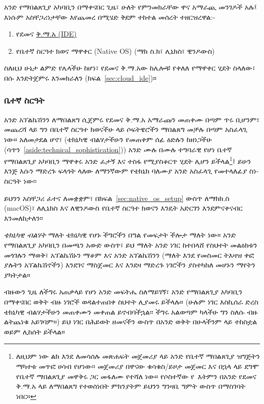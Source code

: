 አንድ የማበልጸጊያ አካባቢን በማቀናበር ጊዜ፣ ሁለት የምንመክራቸው ዋና አማራጪ መንገዶች አሉ፤ እነሱም አስቸጋሪነታቸው እየጨመረ በሚሄድ ቅደም ተከተል መሰረት ተዘርዝረዋል:-

\begin{enumerate}
  \item የደመና \href{https://en.wikipedia.org/wiki/Integrated_development_environment}{ቅ.ማ.አ (IDE)}
  \item የቤተኛ ስርዓተ ክወና ማዋቀር (Native OS) (ማክ ስ.ክ፣ ሊኒክስ፣ ዊንዶውስ)
\end{enumerate}

ስለዚህ ሁኔታ ልምድ የሌላችሁ ከሆነ፣ የደመና ቅ.ማ.አው ከሌሎቹ የቀለለ የማዋቀር ሂደት ስላለው፣ በሱ እንድትጀምሩ እንመክራለን (ክፍል~\ref{sec:cloud_ide})።

\subsubsection{ቤተኛ ስርዓት} %
\label{sec:native_system}

አንድ አፕልኬሽንን ለማበልጸግ ሲጀምሩ የደመና ቅ.ማ.አ አማራጩን መጠቀሙ በጣም ጥሩ ቢሆንም፣
መጨረሻ ላይ ግን በቤተኛ ስርዓተ ክወናችሁ ላይ ሶፍትዌሮችን ማበልጸግ መቻሉ በጣም አስፈላጊ ነው።
አለመታደል ሆኖ፣ (ቴክኒካዊ ብልሃታችሁን የመጠቀም ሰፊ ዕድሉን ከዘነጋችሁ (ሳጥን~\ref{aside:technical_sophistication})) አንድ ሙሉ በሙሉ ተግባራዊ የሆነ ቤተኛ የማበልጸጊያ አካባቢን ማዋቀሩ አንድ ፈታኝ እና ተስፋ የሚያስቆርጥ ሂደት ሊሆን ይችላል\footnote{ለዚህም ነው ልክ እንደ \rortb ለመሳሰሉ መጽሐፍት መጀመሪያ ላይ አንድ የቤተኛ ማበልጸጊያ ዝግጅትን ማካተቱ መጥፎ ሀሳብ የሆነው፡፡ መጀመሪያ በዋናው ቁሳቁስ/ይዞታ መጀመር እና በኋላ ላይ ደግሞ የቤተኛ ማበልጸጊያ መዋቅሩ ጋር መፋለሙ የተሻለ ነው። የሶስተኛው የ\rortb\ እትምን በአንድ የደመና ቅ.ማ.አ ላይ ለማበልጸግ የተወሰነበት ምክንያትም ይህንን ግንዛቤ ግምት ውስጥ በማስገባት ነበር።}፤ ይሁን እንጅ እሱን ማድረጉ ፍላጎት ላለው ለማንኛውም የቴክኒክ ባለሙያ አንድ አስፈላጊ የመተላለፊያ ስነ-ስርዓት ነው፡፡

ይህንን አስቸጋሪ ፈተና ለመቋቋም፣ በክፍል~\ref{sec:native_os_setup} ውስጥ ለማክክ.ስ (macOS)፣ ለሊኒክስ እና ለዊንዶውስ የቤተኛ ስርዓተ ክወናን እንዴት አድርገን እንደምናቀናብር እንመለከታለን፡፡

\begin{aside}
\label{aside:technical_sophistication}

\emph{ቴክኒካዊ ብልሃት} ማለት ቴክኒካዊ የሆኑ ችግሮችን በግል የመፍታት ችሎታ ማለት ነው። አንድ የማበልጸጊያ አካባቢን በመጫን አውድ ውስጥ፣ ይህ ማለት አንድ ነገር ከተበላሸ የስህተት መልዕክቱን መጎገሉን ማወቅ፣ አፕልኬሽኑን ማቆም እና አንድ አፕልኬሽንን (ማለት እንደ የመስመር ትእዛዝ ቀፎ ያሉትን አፕልኬሽኖችን) እንደገና ማስጀመር እና እንደዛ ማድረጉ ነገሮችን ያስተካከለ መሆኑን ማየትን ያካትታል።

ብዙውን ጊዜ ለችግሩ አጠቃላይ የሆነ አንድ መፍትሔ ስለማይገኝ፣ አንድ የማበልጸጊያ አካባቢን በማቀናበር ወቅት ብዙ ነገሮች ወዳልተጠበቀ ስህተት ሊያመሩ ይችላሉ። (ሁሉም ነገር እስኪሰራ ድረስ ቴክኒካዊ ብልሃታችሁን መጠቀሙን መቀጠል ይኖብባችኋል፡፡ ችግሩ አልወጣም ካላችሁ ግን ስለሱ ብዙ ልትጨነቁ አይገባም።) ይህ ነገር በሕይወት ዘመናችን ውስጥ በአንድ ወቅት በሁላችንም ላይ ተከስቷል ወይም ሊከሰት ይችላል።

\end{aside}

